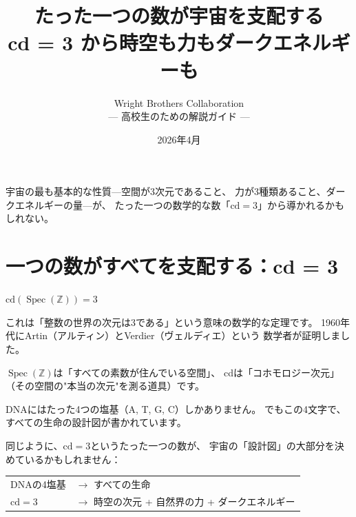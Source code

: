 \documentclass[12pt,a4paper]{article}
\title{\textbf{\Huge たった一つの数が宇宙を支配する}\\[8pt]
\Large cd = 3 から時空も力もダークエネルギーも}
\author{Wright Brothers Collaboration\\
{\normalsize --- 高校生のための解説ガイド ---}}
\date{2026年4月}
\newcommand{\Spec}{\operatorname{Spec}}
\begin{document}
\maketitle

\begin{tcolorbox}[colback=yellow!10!white, colframe=yellow!60!black,
  fonttitle=\bfseries\Large, title={この論文のメッセージ}, arc=4mm]
宇宙の最も基本的な性質---空間が3次元であること、
力が3種類あること、ダークエネルギーの量---が、
たった一つの数学的な数「$\mathrm{cd} = 3$」から導かれるかもしれない。
\end{tcolorbox}

\vspace{1em}

\tableofcontents

\newpage

\section{一つの数がすべてを支配する：cd = 3}

\begin{keyidea}[cd = 3 とは何か？]
$\mathrm{cd}(\Spec(\mathbb{Z})) = 3$

これは「整数の世界の次元は3である」という意味の数学的な定理です。
1960年代にArtin（アルティン）とVerdier（ヴェルディエ）という
数学者が証明しました。

$\Spec(\mathbb{Z})$は「すべての素数が住んでいる空間」、
cdは「コホモロジー次元」（その空間の"本当の次元"を測る道具）です。
\end{keyidea}

\begin{analogy}[DNAのアナロジー]
DNAにはたった4つの塩基（A, T, G, C）しかありません。
でもこの4文字で、すべての生命の設計図が書かれています。

同じように、$\mathrm{cd} = 3$というたった一つの数が、
宇宙の「設計図」の大部分を決めているかもしれません：

\begin{center}
\begin{tabular}{ll}
\toprule
DNAの4塩基 & $\to$ すべての生命 \\
$\mathrm{cd} = 3$ & $\to$ 時空の次元 + 自然界の力 + ダークエネルギー \\
\bottomrule
\end{tabular}
\end{center}
\end{analogy}
\end{document}

